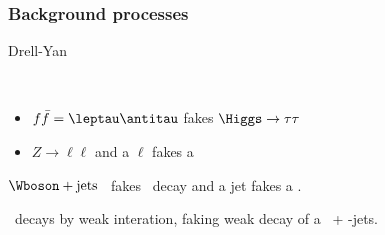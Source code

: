 \begin{frame}
\frametitle{Background processes}
\begin{block}{Drell-Yan}
\hfill
\begin{minipage}[c]{.45\textwidth}
\vspace{\baselineskip}



~
\end{minipage}
\hfill
\begin{minipage}[c]{.4\linewidth}
\begin{itemize}
\item $f\bar{f} = \leptau\antitau$ fakes $\Higgs\to\tau\tau$
\item $Z\to\ell\ell$ and a $\ell$ fakes a \tauh
\end{itemize}
\end{minipage}
\end{block}

\begin{block}{$\Wboson+\text{jets}$}
\Wboson\ fakes \tau\ decay and a jet fakes a \tauh.
\end{block}

\begin{block}{\quarkt\antiquarkt}
\quarkt\ decays by weak interation, faking weak decay of a \tau\ + \quarkb-jets.
\end{block}

\end{frame}